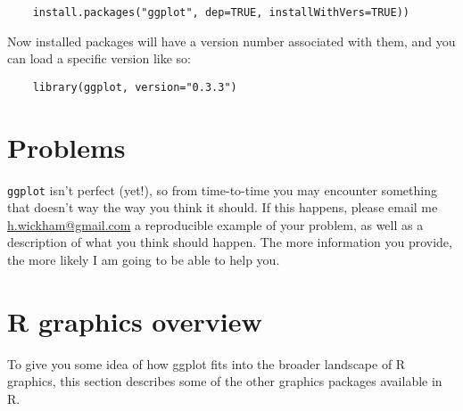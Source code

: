 \begin{verbatim}
	install.packages("ggplot", dep=TRUE, installWithVers=TRUE))
\end{verbatim}

Now installed packages will have a version number associated with them, and you can load a specific version like so:

\begin{verbatim}
	library(ggplot, version="0.3.3")
\end{verbatim}


\section{Problems}\label{sec:problems}

{\tt ggplot} isn't perfect (yet!), so from time-to-time you may encounter something that doesn't way the way you think it should.  If this happens, please email me \href{mailto:h.wickham@gmail.com}{h.wickham@gmail.com} a reproducible example of your problem, as well as a description of what you think should happen.  The more information you provide, the more likely I am going to be able to help you.

\section{R graphics overview}

To give you some idea of how ggplot fits into the broader landscape of R graphics, this section describes some of the other graphics packages available in R.

